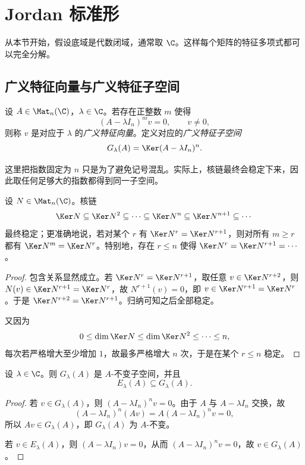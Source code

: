 \section{Jordan 标准形}\label{sec:jordan-form}

从本节开始，假设底域是代数闭域，通常取 \(\C\)。这样每个矩阵的特征多项式都可以完全分解。

\subsection{广义特征向量与广义特征子空间}

\begin{definition}
设 \(A\in \Mat_n(\C)\)，\(\lambda\in \C\)。若存在正整数 \(m\) 使得
\[
(A-\lambda I_n)^m v=0,
\qquad v\neq 0,
\]
则称 \(v\) 是对应于 \(\lambda\) 的\emph{广义特征向量}。定义对应的\emph{广义特征子空间}
\[
G_\lambda(A)=\Ker(A-\lambda I_n)^n.
\]
\end{definition}

这里把指数固定为 \(n\) 只是为了避免记号混乱。实际上，核链最终会稳定下来，因此取任何足够大的指数都得到同一子空间。

\begin{lemma}\label{lem:kernel-stabilize}
设 \(N\in \Mat_n(\C)\)。核链
\[
\Ker N\subseteq \Ker N^2\subseteq \cdots\subseteq \Ker N^n\subseteq \Ker N^{n+1}\subseteq \cdots
\]
最终稳定；更准确地说，若对某个 \(r\) 有 \(\Ker N^r=\Ker N^{r+1}\)，则对所有 \(m\ge r\) 都有 \(\Ker N^m=\Ker N^r\)。特别地，存在 \(r\le n\) 使得 \(\Ker N^r=\Ker N^{r+1}=\cdots\)。
\end{lemma}

\begin{proof}
包含关系显然成立。若 \(\Ker N^r=\Ker N^{r+1}\)，取任意 \(v\in \Ker N^{r+2}\)，则 \(N(v)\in \Ker N^{r+1}=\Ker N^r\)，故 \(N^{r+1}(v)=0\)，即 \(v\in \Ker N^{r+1}=\Ker N^r\)。于是 \(\Ker N^{r+2}=\Ker N^{r+1}\)。归纳可知之后全部稳定。

又因为
\[
0\le \dim\Ker N\le \dim\Ker N^2\le \cdots\le n,
\]
每次若严格增大至少增加 \(1\)，故最多严格增大 \(n\) 次，于是在某个 \(r\le n\) 稳定。
\end{proof}

\begin{proposition}
设 \(\lambda\in \C\)。则 \(G_\lambda(A)\) 是 \(A\)-不变子空间，并且
\[
E_\lambda(A)\subseteq G_\lambda(A).
\]
\end{proposition}

\begin{proof}
若 \(v\in G_\lambda(A)\)，则 \((A-\lambda I_n)^n v=0\)。由于 \(A\) 与 \(A-\lambda I_n\) 交换，故
\[
(A-\lambda I_n)^n(Av)=A(A-\lambda I_n)^n v=0,
\]
所以 \(Av\in G_\lambda(A)\)，即 \(G_\lambda(A)\) 为 \(A\)-不变。

若 \(v\in E_\lambda(A)\)，则 \((A-\lambda I_n)v=0\)，从而 \((A-\lambda I_n)^n v=0\)，故 \(v\in G_\lambda(A)\)。
\end{proof}

